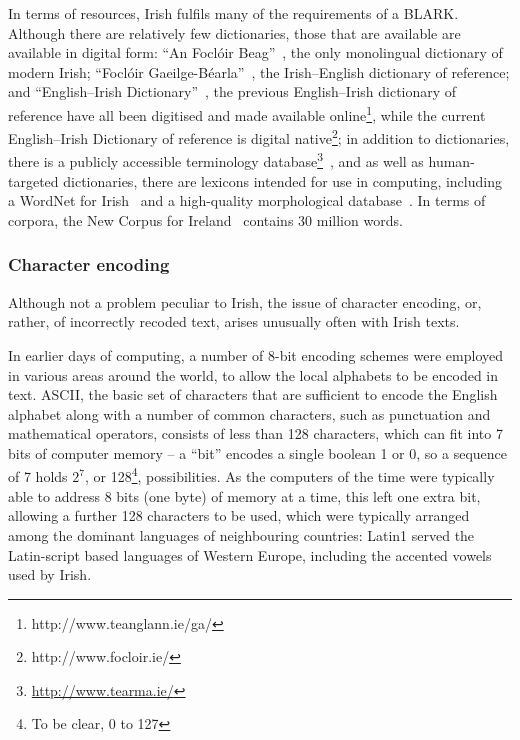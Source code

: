 In terms of resources, Irish fulfils many of the requirements of a BLARK. Although there
are relatively few dictionaries, those that are available are available in digital form:
``An Focl\'oir Beag''~\citep{odonaill1991focloirbeag}, the only monolingual dictionary
of modern Irish; ``Focl{\'o}ir Gaeilge-B{\'e}arla''~\citep{donaill1977focloir}, the Irish--English
dictionary of reference; and ``English--Irish Dictionary''~\citep{debhaldraithe1959english}, the 
previous English--Irish dictionary of reference have all been digitised and made available online\footnote{http://www.teanglann.ie/ga/},
while the current English--Irish Dictionary of reference is digital native\footnote{http://www.focloir.ie/}; 
in addition to dictionaries, there is a publicly accessible terminology database\footnote{\href{http://www.tearma.ie/}{http://www.tearma.ie/}}~\citep{mvechura2010focal}, and
as well as human-targeted dictionaries, there are lexicons intended for use in computing, including a WordNet for Irish~\citep{oregan2016lemongawn}
and a high-quality morphological database~\citep{mchura2014}.
In terms of corpora, the New Corpus for Ireland~\citep{Kilgarriff2006EfficientCD} contains 30 million words.

\subsubsection{Character encoding}

Although not a problem peculiar to Irish, the issue of character encoding, or, rather, of incorrectly recoded
text, arises unusually often with Irish texts.

In earlier days of computing, a number of 8-bit encoding schemes were employed in various areas around the world,
to allow the local alphabets to be encoded in text. ASCII, the basic set of characters that are sufficient to
encode the English alphabet along with a number of common characters, such as punctuation and mathematical operators,
consists of less than 128 characters, which can fit into 7 bits of computer memory -- a ``bit'' encodes a single
boolean 1 or 0, so a sequence of 7 holds $2^7$, or 128\footnote{To be clear, 0 to 127}, possibilities. As the computers of the time were typically
able to address 8 bits (one byte) of memory at a time, this left one extra bit, allowing a further 128 characters to be used,
which were typically arranged among the dominant languages of neighbouring countries: Latin1 served the Latin-script
based languages of Western Europe, including the accented vowels used by Irish.

